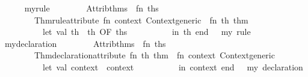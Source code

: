 \begin{isabellebody}
\begin{isamarkuptext}
\begin{description}
  \end{description}%
\end{isamarkuptext}%
\isamarkuptrue%
%
\isadelimML
\ \ \ \ %
\endisadelimML
%
\isatagML
{}\isamarkupfalse%
\ my{}rule\ {}\ {}\isanewline
\ \ \ \ \ \ Attrib{}thms\ {}{}\ {}fn\ ths\ {}{}\isanewline
\ \ \ \ \ \ \ \ Thm{}rule{}attribute\ {}fn\ context{}\ Context{}generic\ {}{}\ fn\ th{}\ thm\ {}{}\isanewline
\ \ \ \ \ \ \ \ \ \ let\ val\ th{}\ {}\ th\ OF\ ths\isanewline
\ \ \ \ \ \ \ \ \ \ in\ th{}\ end{}{}\ {}\ \ {}my\ rule{}\isanewline
\isanewline
\ \ \ \ \isamarkupfalse%
\ my{}declaration\ {}\ {}\isanewline
\ \ \ \ \ \ Attrib{}thms\ {}{}\ {}fn\ ths\ {}{}\isanewline
\ \ \ \ \ \ \ \ Thm{}declaration{}attribute\ {}fn\ th{}\ thm\ {}{}\ fn\ context{}\ Context{}generic\ {}{}\isanewline
\ \ \ \ \ \ \ \ \ \ let\ val\ context{}\ {}\ context\isanewline
\ \ \ \ \ \ \ \ \ \ in\ context{}\ end{}{}\ {}\ \ {}my\ declaration{}%

\end{isabellebody}
